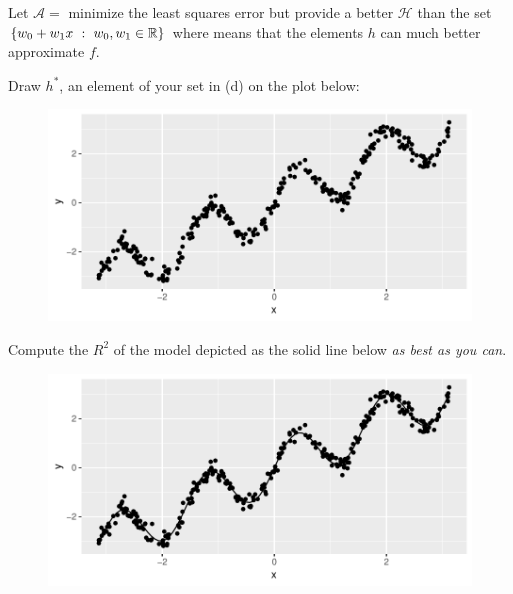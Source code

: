 \documentclass[12pt]{article}
\begin{document}

 Let $\mathcal{A} = $ minimize the least squares error but provide a better $\mathcal{H}$ than the set $\left\{w_0 + w_1 x~:~w_0, w_1 \in \mathbb{R}\right\}$ where  means that the elements $h$ can much better approximate $f$. 


 Draw $h^*$, an element of your set in (d) on the plot below:

\begin{figure}[htp]
\centering
\includegraphics[width=5in]{curvyline}
\end{figure}


 Compute the $R^2$ of the model depicted as the solid line below \emph{as best as you can}.

\begin{figure}[htp]
\includegraphics[width=5in]{curvyline_with_f}
\end{figure}~


\eenum
\end{document}
